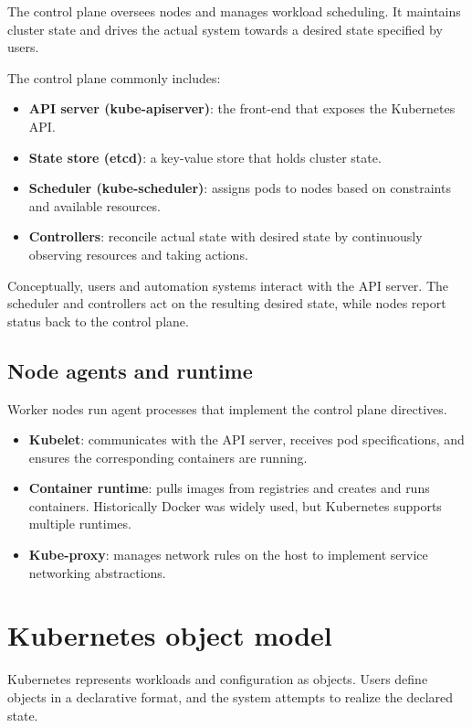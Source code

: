 \documentclass[11pt,a4paper,openany]{report}
\begin{document}
The control plane oversees nodes and manages workload scheduling. It maintains cluster state and drives the actual system towards a desired state specified by users.

The control plane commonly includes:

\begin{itemize}
\item \textbf{API server (kube-apiserver)}: the front-end that exposes the Kubernetes API.
\item \textbf{State store (etcd)}: a key-value store that holds cluster state.
\item \textbf{Scheduler (kube-scheduler)}: assigns pods to nodes based on constraints and available resources.
\item \textbf{Controllers}: reconcile actual state with desired state by continuously observing resources and taking actions.
\end{itemize}

Conceptually, users and automation systems interact with the API server. The scheduler and controllers act on the resulting desired state, while nodes report status back to the control plane.

\subsection{Node agents and runtime}

Worker nodes run agent processes that implement the control plane directives.

\begin{itemize}
\item \textbf{Kubelet}: communicates with the API server, receives pod specifications, and ensures the corresponding containers are running.
\item \textbf{Container runtime}: pulls images from registries and creates and runs containers. Historically Docker was widely used, but Kubernetes supports multiple runtimes.
\item \textbf{Kube-proxy}: manages network rules on the host to implement service networking abstractions.
\end{itemize}

\section{Kubernetes object model}

Kubernetes represents workloads and configuration as objects. Users define objects in a declarative format, and the system attempts to realize the declared state.
\end{document}
